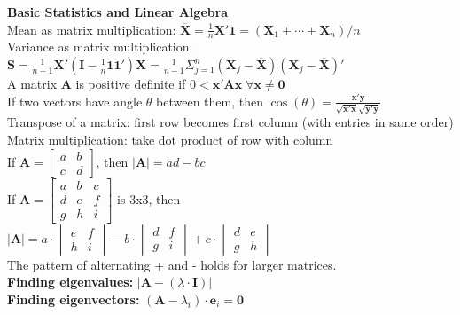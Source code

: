 \documentclass[5pt,twocolumn]{article}
\begin{document}
	\noindent \textbf{Basic Statistics and Linear Algebra}\\
	Mean as matrix multiplication: $\mathbf{\overline{X}} = \frac{1}{n}\mathbf{X'1} = (\mathbf{X}_1 + \cdots + \mathbf{X}_n)/n$\\
	Variance as matrix multiplication: $\mathbf{S} = \frac{1}{n-1}\mathbf{X'}\left(\mathbf{I} - \frac{1}{n}\mathbf{11'}\right)\mathbf{X} = \frac{1}{n-1}\Sigma_{j=1}^n (\mathbf{X}_j - \mathbf{\overline{X}})(\mathbf{X}_j - \mathbf{\overline{X}})'$\\
	A matrix $\mathbf{A}$ is positive definite if $0 < \mathbf{x'Ax} \; \forall \mathbf{x} \neq \mathbf{0}$\\
	If two vectors have angle $\theta$ between them, then $\cos(\theta) = \frac{\mathbf{x'y}}{\sqrt{\mathbf{x'x}}\sqrt{\mathbf{y'y}}}$\\
	Transpose of a matrix: first row becomes first column (with entries in same order)\\
	Matrix multiplication: take dot product of row with column\\
	If $\mathbf{A} = \begin{bmatrix}
a & b\\
c & d
\end{bmatrix}$, then $|\mathbf{A}| = ad - bc$\\
	\indent If $\mathbf{A} = \begin{bmatrix}
a & b & c\\
d & e & f\\
g & h & i
\end{bmatrix}$ is 3x3, then \\
	\indent \indent $|\mathbf{A}| = a \cdot \begin{vmatrix}
e & f\\
h & i
\end{vmatrix} - b \cdot \begin{vmatrix}
d & f\\
g & i
\end{vmatrix} + c \cdot \begin{vmatrix}
d & e\\
g & h
\end{vmatrix}$\\
	\indent The pattern of alternating + and - holds for larger matrices.\\
	\textbf{Finding eigenvalues:} $|\mathbf{A} - (\lambda \cdot \mathbf{I})|$\\
	\textbf{Finding eigenvectors:} $(\mathbf{A} - \lambda_i) \cdot \mathbf{e}_i = \mathbf{0}$\\
\end{document}
